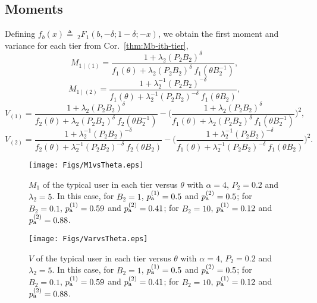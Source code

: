 \documentclass[12pt,draftclsnofoot,journal,onecolumn]{IEEEtran}
\newlength{\figwidth}
\begin{document}
\subsection{Moments}
Defining $f_b(x)\triangleq \:_2F_1(b,-\delta; 1-\delta; -x)$, we obtain the first moment and variance for each tier from Cor.~\ref{thm:Mb-ith-tier}, 
\begin{equation}\label{eq:M1tier1}
M_{1\mid (1)} = \frac{1+\lambda_2 (P_2 B_2)^\delta}{f_1(\theta)+\lambda_2 (P_2 B_2)^\delta~ f_1(\theta B_2^{-1})},
\end{equation}
\begin{equation}\label{eq:M1tier2}
M_{1\mid (2)} = \frac{1+\lambda_2^{-1} (P_2 B_2)^{-\delta}}{f_1(\theta)+\lambda_2^{-1} (P_2 B_2)^{-\delta}~ f_1(\theta B_2)},
\end{equation}
\begin{equation}\label{eq:V1}
V_{(1)} = \frac{1+\lambda_2 (P_2 B_2)^\delta}{f_2(\theta)+\lambda_2 (P_2 B_2)^\delta~ f_2(\theta B_2^{-1})}-\Big(\frac{1+\lambda_2 (P_2 B_2)^\delta}{f_1(\theta)+\lambda_2 (P_2 B_2)^\delta~ f_1(\theta B_2^{-1})}\Big)^2,
\end{equation}
\begin{equation}\label{eq:V2}
V_{(2)} = \frac{1+\lambda_2^{-1} (P_2 B_2)^{-\delta}}{f_2(\theta)+\lambda_2^{-1} (P_2 B_2)^{-\delta}~ f_2(\theta B_2)}-\Big(\frac{1+\lambda_2^{-1} (P_2 B_2)^{-\delta}}{f_1(\theta)+\lambda_2^{-1} (P_2 B_2)^{-\delta}~ f_1(\theta B_2)}\Big)^2.
\end{equation}
\begin{figure} [!t]
	\begin{center}
		\texttt{[image: Figs/M1vsTheta.eps]}
		\caption{$M_1$ of the typical user in each tier versus $\theta$ with $\alpha=4$, $P_2=0.2$ and $\lambda_2=5$. In this case, for $B_2=1$, $p_{\rm a}^{(1)}=0.5$ and $p_{\rm a}^{(2)}=0.5$; for $B_2=0.1$, $p_{\rm a}^{(1)}=0.59$ and $p_{\rm a}^{(2)}=0.41$; for $B_2=10$, $p_{\rm a}^{(1)}=0.12$ and $p_{\rm a}^{(2)}=0.88$.}
		\label{fig:M1vsTheta}
	\end{center}
\end{figure} 
\begin{figure} [!t]
	\begin{center}
		\texttt{[image: Figs/VarvsTheta.eps]}
		\caption{$V$ of the typical user in each tier versus $\theta$ with $\alpha=4$, $P_2=0.2$ and $\lambda_2=5$. In this case, for $B_2=1$, $p_{\rm a}^{(1)}=0.5$ and $p_{\rm a}^{(2)}=0.5$; for $B_2=0.1$, $p_{\rm a}^{(1)}=0.59$ and $p_{\rm a}^{(2)}=0.41$; for $B_2=10$, $p_{\rm a}^{(1)}=0.12$ and $p_{\rm a}^{(2)}=0.88$.}
		\label{fig:VarvsTheta}
	\end{center}
\end{figure}
\end{document}
